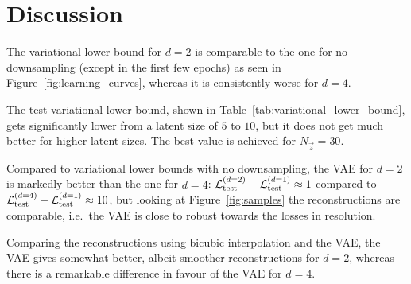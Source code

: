 \section{Discussion}
\label{sec:discussion}

The variational lower bound for $d = 2$ is comparable to the one for no downsampling (except in the first few epochs) as seen in Figure~\ref{fig:learning_curves}, whereas it is consistently worse for $d = 4$.

The test variational lower bound, shown in Table~\ref{tab:variational_lower_bound}, gets significantly lower from a latent size of $5$ to $10$, but it does not get much better for higher latent sizes. The best value is achieved for $N_{\vec{z}} = 30$.

Compared to variational lower bounds with no downsampling,
	the VAE for $d = 2$ is markedly better than the one for $d = 4$: $\mathcal{L}_{\text{test}}^{(d = 2)} - \mathcal{L}_{\text{test}}^{(d = 1)} \approx 1$ compared to $\mathcal{L}_{\text{test}}^{(d = 4)} - \mathcal{L}_{\text{test}}^{(d = 1)} \approx 10$, but looking at Figure~\ref{fig:samples} the reconstructions are comparable, i.e.\ the VAE is close to robust towards the losses in resolution.

Comparing the reconstructions using bicubic interpolation and the VAE, the VAE gives somewhat better, albeit smoother reconstructions for $d = 2$, whereas there is a remarkable difference in favour of the VAE for $d = 4$.
